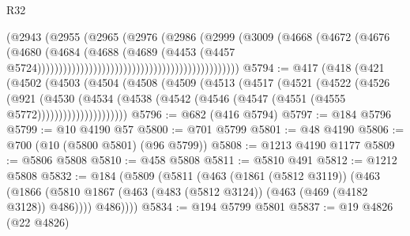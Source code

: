 \begin{lexlean}{R32}
\begin{coremodule}
                                                                  (@2943
                                                                    (@2955
                                                                      (@2965
                                                                        (@2976
                                                                          (@2986
                                                                            (@2999
                                                                              (@3009
                                                                                (@4668
                                                                                  (@4672
                                                                                    (@4676
                                                                                      (@4680
                                                                                        (@4684
                                                                                          (@4688
                                                                                            (@4689
                                                                                              (@4453
                                                                                                (@4457
                                                                                                  @5724)))))))))))))))))))))))))))))))))))))))))))))))
@5794 := @417
    (@418
      (@421
        (@4502
          (@4503
            (@4504
              (@4508
                (@4509
                  (@4513
                    (@4517
                      (@4521
                        (@4522
                          (@4526
                            (@921
                              (@4530
                                (@4534
                                  (@4538
                                    (@4542 (@4546 (@4547 (@4551 (@4555 @5772)))))))))))))))))))))
@5796 := @682 (@416 @5794)
@5797 := @184 @5796
@5799 := @10 @4190 @57
@5800 := @701 @5799
@5801 := @48 @4190
@5806 := @700 (@10 (@5800 @5801) (@96 @5799))
@5808 := @1213 @4190 @1177
@5809 := @5806 @5808
@5810 := @458 @5808
@5811 := @5810 @491
@5812 := @1212 @5808
@5832 := @184
    (@5809
      (@5811
        (@463
          (@1861 (@5812 @3119))
          (@463
            (@1866 (@5810 @1867 (@463 (@483 (@5812 @3124)) (@463 (@469 (@4182 @3128)) @486))))
            @486))))
@5834 := @194 @5799 @5801
@5837 := @19 @4826 (@22 @4826)

\end{coremodule}
\end{lexlean}
